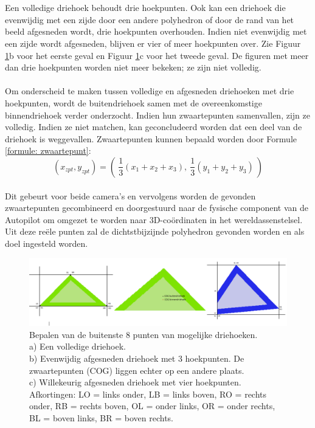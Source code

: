 \\\\
Een volledige driehoek behoudt drie hoekpunten. Ook kan een driehoek die evenwijdig met een zijde door een andere polyhedron of door de rand van het beeld afgesneden wordt, drie hoekpunten overhouden. Indien niet evenwijdig met een zijde wordt afgesneden, blijven er vier of meer hoekpunten over. Zie Figuur \ref{fig:DrieGevallenDriehoeken}b voor het eerste geval en Figuur \ref{fig:DrieGevallenDriehoeken}c voor het tweede geval. De figuren met meer dan drie hoekpunten worden niet meer bekeken; ze zijn niet volledig.
\\\\
Om onderscheid te maken tussen volledige en afgesneden driehoeken met drie hoekpunten, wordt de buitendriehoek samen met de overeenkomstige binnendriehoek verder onderzocht. Indien hun zwaartepunten samenvallen, zijn ze volledig. Indien ze niet matchen, kan geconcludeerd worden dat een deel van de driehoek is weggevallen. Zwaartepunten kunnen bepaald worden door Formule \ref{formule: zwaartepunt}: \begin{equation}
\label{formule: zwaartepunt}
(x_{zpt},y_{zpt}) = ( \ \frac{1}{3}(x_1 + x_2 + x_3) , \ \frac{1}{3}(y_1 + y_2 + y_3) \ )
\end{equation}
\\
Dit gebeurt voor beide camera's en vervolgens worden de gevonden zwaartepunten gecombineerd en doorgestuurd naar de fysische component van de Autopilot om omgezet te worden naar 3D-co\"ordinaten in het wereldassenstelsel. Uit deze re\"ele punten zal de dichtstbijzijnde polyhedron gevonden worden en als doel ingesteld worden.
\\
\begin{figure}[h]
	\centering
	\includegraphics[width=1\textwidth]{BeeldverwerkingDriehoeken.png}
	\caption{Bepalen van de buitenste 8 punten van mogelijke driehoeken. \\ a) Een volledige driehoek. \\ b) Evenwijdig afgesneden driehoek met 3 hoekpunten. De zwaartepunten (COG) liggen echter op een andere plaats. \\ c) Willekeurig afgesneden driehoek met vier hoekpunten. \\ 
	Afkortingen: LO = links onder, LB = links boven, RO = rechts onder, RB = rechts boven, OL = onder links, OR = onder rechts, BL = boven links, BR = boven rechts.}
	\label{fig:DrieGevallenDriehoeken}
\end{figure}

